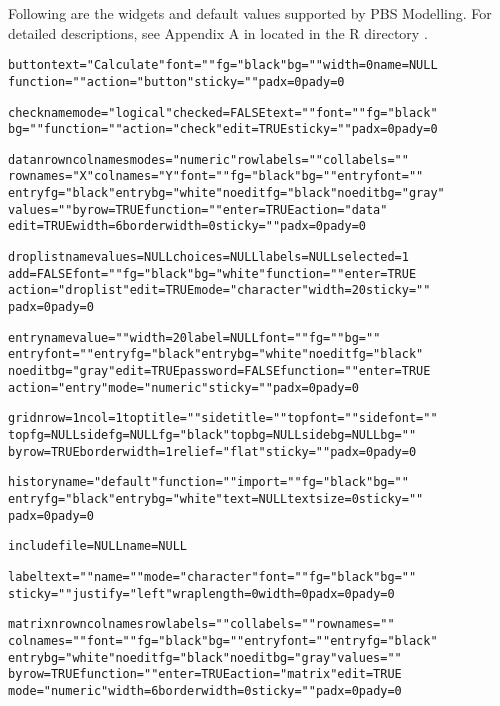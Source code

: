 \documentclass[letterpaper]{book}
\begin{document}
\begin{Details}\relax
Following are the widgets and default values supported by PBS Modelling.
For detailed descriptions, see Appendix A in  
located in the R directory .

\begin{alltt}
button text="Calculate" font="" fg="black" bg="" width=0 name=NULL
   function="" action="button" sticky="" padx=0 pady=0

check name mode="logical" checked=FALSE text="" font="" fg="black"
   bg="" function="" action="check" edit=TRUE sticky="" padx=0 pady=0

data nrow ncol names modes="numeric" rowlabels="" collabels=""
   rownames="X" colnames="Y" font="" fg="black" bg="" entryfont=""
   entryfg="black" entrybg="white" noeditfg="black" noeditbg="gray"
   values="" byrow=TRUE function="" enter=TRUE action="data"
   edit=TRUE width=6 borderwidth=0 sticky="" padx=0 pady=0

droplist name values=NULL choices=NULL labels=NULL selected=1
   add=FALSE font="" fg="black" bg="white" function="" enter=TRUE
   action="droplist" edit=TRUE mode="character" width=20 sticky=""
   padx=0 pady=0

entry name value="" width=20 label=NULL font="" fg="" bg=""
   entryfont="" entryfg="black" entrybg="white" noeditfg="black"
   noeditbg="gray" edit=TRUE password=FALSE function="" enter=TRUE
   action="entry" mode="numeric" sticky="" padx=0 pady=0

grid nrow=1 ncol=1 toptitle="" sidetitle="" topfont="" sidefont=""
   topfg=NULL sidefg=NULL fg="black" topbg=NULL sidebg=NULL bg=""
   byrow=TRUE borderwidth=1 relief="flat" sticky="" padx=0 pady=0

history name="default" function="" import="" fg="black" bg=""
   entryfg="black" entrybg="white" text=NULL textsize=0 sticky=""
   padx=0 pady=0

include file=NULL name=NULL

label text="" name="" mode="character" font="" fg="black" bg=""
   sticky="" justify="left" wraplength=0 width=0 padx=0 pady=0

matrix nrow ncol names rowlabels="" collabels="" rownames=""
   colnames="" font="" fg="black" bg="" entryfont="" entryfg="black"
   entrybg="white" noeditfg="black" noeditbg="gray" values=""
   byrow=TRUE function="" enter=TRUE action="matrix" edit=TRUE
   mode="numeric" width=6 borderwidth=0 sticky="" padx=0 pady=0


\end{alltt}
\end{Details}
\end{document}
